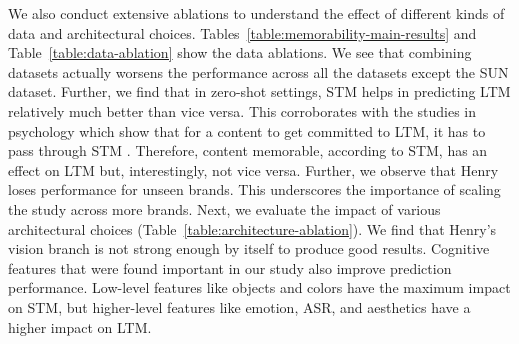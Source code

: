 We also conduct extensive ablations to understand the effect of different kinds of data and architectural choices. Tables~\ref{table:memorability-main-results} and Table~\ref{table:data-ablation} show the data ablations. We see that combining datasets actually worsens the performance across all the datasets except the SUN dataset. Further, we find that in zero-shot settings, STM helps in predicting LTM relatively much better than vice versa. This corroborates with the studies in psychology which show that for a content to get committed to LTM, it has to pass through STM \cite{norris2017short}. Therefore, content memorable, according to STM, has an effect on LTM but, interestingly, not vice versa. %
Further, we observe that Henry loses performance for unseen brands. This underscores the importance of scaling the study across more brands. Next, we evaluate the impact of various architectural choices  (Table~\ref{table:architecture-ablation}). We find that Henry's vision branch is not strong enough by itself to produce good results. Cognitive features that were found important in our study also improve prediction performance. Low-level features like objects and colors have the maximum impact on STM, but higher-level features like emotion, ASR, and aesthetics have a higher impact on LTM.


